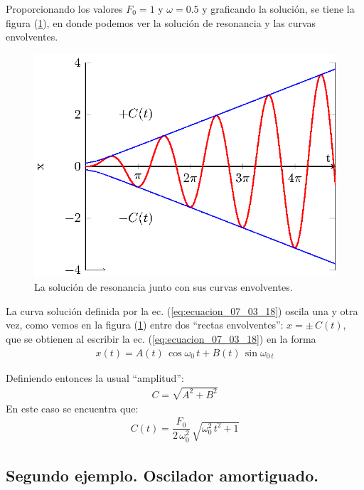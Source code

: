 Proporcionando los valores $F_{0} = 1$ y $\omega = 0.5$ y graficando la solución, se tiene la figura (\ref{fig_figura_07_03_04}), en donde podemos ver la solución de resonancia y las curvas envolventes.
\begin{figure}[H]
    \centering
    \includegraphics[scale=1]{Imagenes/sist_masa_resorte_resonancia_plot_01.eps}
    \caption{La solución de resonancia junto con sus curvas envolventes.}
    \label{fig_figura_07_03_04}
\end{figure}

La curva solución definida por la ec. (\ref{eq:ecuacion_07_03_18}) oscila una y otra vez, como vemos en la figura (\ref{fig_figura_07_03_04}) entre dos \enquote{rectas envolventes}: $x = \pm \, C(t)$, que se obtienen al escribir la ec. (\ref{eq:ecuacion_07_03_18}) en la forma
\begin{align*}
x(t) =  A(t) \, \cos \omega_{0} \, t +  B(t) \, \sin \omega_{0 \, t}
\end{align*}

Definiendo entonces la usual \enquote{amplitud}:
\begin{align*}
C = \sqrt{A^{2} +  B^{2}}
\end{align*}
En este caso se encuentra que:
\begin{align*}
C(t) = \dfrac{F_{0}}{2 \, \omega_{0}^{2}} \, \sqrt{\omega_{0}^{2} \, t^{2} + 1}
\end{align*}

\subsection{Segundo ejemplo. Oscilador amortiguado.}

